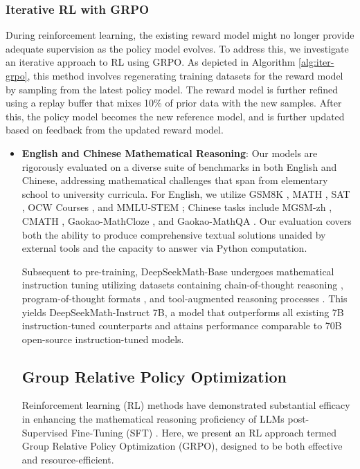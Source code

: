 \subsubsection{Iterative RL with GRPO} During reinforcement learning, the existing reward model might no longer provide adequate supervision as the policy model evolves. To address this, we investigate an iterative approach to RL using GRPO. As depicted in Algorithm \ref{alg:iter-grpo}, this method involves regenerating training datasets for the reward model by sampling from the latest policy model. The reward model is further refined using a replay buffer that mixes 10\% of prior data with the new samples. After this, the policy model becomes the new reference model, and is further updated based on feedback from the updated reward model.

\begin{itemize}[topsep=0pt]
    \item \textbf{English and Chinese Mathematical Reasoning}: Our models are rigorously evaluated on a diverse suite of benchmarks in both English and Chinese, addressing mathematical challenges that span from elementary school to university curricula. For English, we utilize GSM8K \citep{gsm8k}, MATH \citep{MATH}, SAT \citep{llemma}, OCW Courses \citep{minerva}, and MMLU-STEM \citep{mmlu}; Chinese tasks include MGSM-zh \citep{mgsm}, CMATH \citep{wei2023cmath}, Gaokao-MathCloze \citep{agieval}, and Gaokao-MathQA \citep{agieval}. Our evaluation covers both the ability to produce comprehensive textual solutions unaided by external tools and the capacity to answer via Python computation.

Subsequent to pre-training, DeepSeekMath-Base undergoes mathematical instruction tuning utilizing datasets containing chain-of-thought reasoning \citep{cot}, program-of-thought formats \citep{pot,pal}, and tool-augmented reasoning processes \citep{tora}. This yields DeepSeekMath-Instruct 7B, a model that outperforms all existing 7B instruction-tuned counterparts and attains performance comparable to 70B open-source instruction-tuned models.

\subsection{Group Relative Policy Optimization} Reinforcement learning (RL) methods have demonstrated substantial efficacy in enhancing the mathematical reasoning proficiency of LLMs post-Supervised Fine-Tuning (SFT) \citep{wang2023math,wizardmath}. Here, we present an RL approach termed Group Relative Policy Optimization (GRPO), designed to be both effective and resource-efficient.


\end{itemize}
